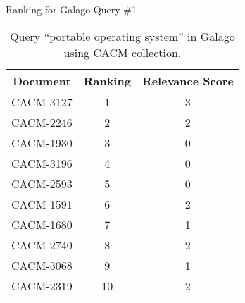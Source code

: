 \begin{table}[!htbp]
	\caption{Ranking for Galago Query \#1} \label{tab:rank1}
	\begin{center}
	\vspace{-5mm}
		\begin{tabular}{ c | c | c}
			\toprule
			Document & Ranking & Relevance Score\\
			\midrule
			CACM-3127 & 1 & 3\\
			CACM-2246 & 2 & 2\\
			CACM-1930 & 3 & 0\\
			CACM-3196 & 4 & 0\\
			CACM-2593 & 5 & 0\\
			CACM-1591 & 6 & 2\\
			CACM-1680 & 7 & 1\\
			CACM-2740 & 8 & 2\\
			CACM-3068 & 9 & 1\\
			CACM-2319 & 10 & 2\\
			\bottomrule
		\end{tabular}
	\caption*{\scriptsize Query ``portable operating system'' in Galago using CACM collection.}
	 \end{center}
\end{table}
